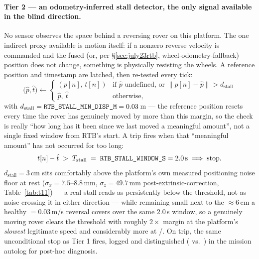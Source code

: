 \paragraph{Tier 2 — an odometry-inferred stall detector, the only signal
available in the blind direction.} No sensor observes the space behind a
reversing rover on this platform. The one indirect proxy available is
motion itself: if a nonzero reverse velocity is commanded and the fused (or,
per \S\ref{sec:july23rtb}, wheel-odometry-fallback) position does not
change, something is physically resisting the wheels. A reference position
and timestamp are latched, then re-tested every tick:
\begin{equation}
\big(\hat p, \hat t\big) \leftarrow
\begin{cases}
(p[n],\, t[n]) & \text{if } \hat p \text{ undefined, or } \lVert p[n]-\hat p\rVert > d_{\text{stall}} \\
\hat p,\ \hat t & \text{otherwise,}
\end{cases}
\label{eq:rtbstallref}
\end{equation}
with $d_{\text{stall}} = \code{RTB\_STALL\_MIN\_DISP\_M} = 0.03$\,m — the
reference position resets every time the rover has genuinely moved by more
than this margin, so the check is really ``how long has it been since we
last moved a meaningful amount'', not a single fixed window from RTB's
start. A trip fires when that ``meaningful amount'' has not occurred for
too long:
\begin{equation}
t[n] - \hat t \;>\; T_{\text{stall}} \;=\; \code{RTB\_STALL\_WINDOW\_S} = 2.0\text{\,s}
\;\Longrightarrow\; \text{stop.}
\label{eq:rtbstalltrip}
\end{equation}
$d_{\text{stall}}=3$\,cm sits comfortably above the platform's own measured
positioning noise floor at rest ($\sigma_x=7.5$--$8.8$\,mm, $\sigma_z=49.7$\,mm
post-extrinsic-correction, Table~\ref{tab:t11}) — a real stall reads as
persistently below the threshold, not as noise crossing it in either
direction — while remaining small next to the $\approx6$\,cm a healthy
$=0.03$\,m/s reversal covers over the same $2.0$\,s
window, so a genuinely moving rover clears the threshold with roughly $2\times$
margin at the platform's \emph{slowest} legitimate speed and considerably
more at /. On trip, the same
unconditional stop as Tier 1 fires, logged and distinguished
( vs.\ ) in the mission autolog for
post-hoc diagnosis.

